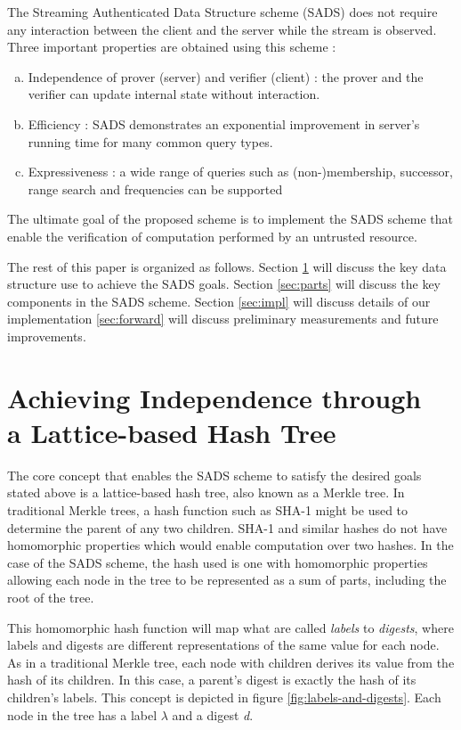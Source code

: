 \documentclass[11pt, letterpaper, oneside]{article}
\begin{document}
	The Streaming Authenticated Data Structure scheme (SADS) \cite{sads} does not require any interaction between the client and the server while the stream is observed.
	Three important properties are obtained using this scheme :
	\begin{enumerate}[a.]
		\item Independence of prover (server) and verifier (client) : the prover and the verifier can update internal state without interaction.
		\item Efficiency : SADS demonstrates an exponential improvement in server's running time for many common query types.
		\item Expressiveness : a wide range of queries such as (non-)membership, successor, range search and frequencies can be supported
	\end{enumerate}
	The ultimate goal of the proposed scheme is to implement the SADS scheme that enable the verification of computation performed by an untrusted resource.

	The rest of this paper is organized as follows.
	Section \ref{sec:tree} will discuss the key data structure use to achieve the SADS goals.
	Section \ref{sec:parts} will discuss the key components in the SADS scheme.
	Section \ref{sec:impl} will discuss details of our implementation \ref{sec:forward} will discuss preliminary measurements and future improvements.

\section{ Achieving Independence through \\ a Lattice-based Hash Tree }
\label{sec:tree}

	The core concept that enables the SADS scheme to satisfy the desired goals stated above is a lattice-based hash tree, also known as a Merkle tree.
	In traditional Merkle trees, a hash function such as SHA-1 might be used to determine the parent of any two children.
	SHA-1 and similar hashes do not have homomorphic properties which would enable computation over two hashes.
	In the case of the SADS scheme, the hash used is one with homomorphic properties allowing each node in the tree to be represented as a sum of parts, including the root of the tree.

	This homomorphic hash function will map what are called \textit{labels} to \textit{digests}, where labels and digests are different representations of the same value for each node.
	As in a traditional Merkle tree, each node with children derives its value from the hash of its children.
	In this case, a parent's digest is exactly the hash of its children's labels.
	This concept is depicted in figure \ref{fig:labels-and-digests}.
	Each node in the tree has a label $\lambda$ and a digest \textit{d}.
\end{document}
